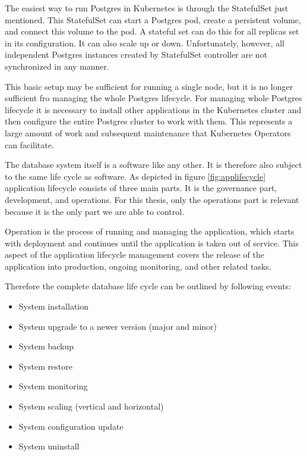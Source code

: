 The easiest way to run Postgres in Kubernetes is through the StatefulSet just mentioned. This StatefulSet can start a Postgres pod, create a persistent volume, and connect this volume to the pod. A stateful set can do this for all replicas set in its configuration. It can also scale up or down. Unfortunately, however, all independent Postgres instances created by StatefulSet controller are not synchronized in any manner.

This basic setup may be sufficient for running a single node, but it is no longer sufficient fro managing the whole Postgres lifecycle. For managing whole Postgres lifecycle it is necessary to install other applications in the Kubernetes cluster and then configure the entire Postgres cluster to work with them. This represents a large amount of work and subsequent maintenance that Kubernetes Operators can facilitate.

\label{chap:lifecycle}
The database system itself is a software like any other. It is therefore also subject to the same life cycle as software.
As depicted in figure \ref{fig:applifecycle} application lifecycle consists of three main parts. It is the governance part, development, and operations. For this thesis, only the operations part is relevant because it is the only part we are able to control.

Operation is the process of running and managing the application, which starts with deployment and continues until the application is taken out of service. This aspect of the application lifecycle management covers the release of the application into production, ongoing monitoring, and other related tasks. \cite{ALM}

Therefore the complete database life cycle can be outlined by following events:
\begin{itemize}
  \item System installation
  \item System upgrade to a newer version (major and minor)
  \item System backup
  \item System restore
  \item System monitoring
  \item System scaling (vertical and horizontal)
  \item System configuration update
  \item System uninstall
\end{itemize}

